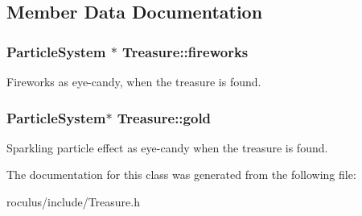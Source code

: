 \subsection{\-Member \-Data \-Documentation}
\hypertarget{classTreasure_a03e1ea9a9e71f70f453b8bd7e46d5a02}{
\subsubsection[{fireworks}]{\setlength{\rightskip}{0pt plus 5cm}\-Particle\-System $\ast$ {\bf \-Treasure\-::fireworks}}}\label{classTreasure_a03e1ea9a9e71f70f453b8bd7e46d5a02}
\-Fireworks as eye-\/candy, when the treasure is found. \hypertarget{classTreasure_a81c9f96d7d58e6181a2e1fef8e815c65}{
\subsubsection[{gold}]{\setlength{\rightskip}{0pt plus 5cm}\-Particle\-System$\ast$ {\bf \-Treasure\-::gold}}}\label{classTreasure_a81c9f96d7d58e6181a2e1fef8e815c65}
\-Sparkling particle effect as eye-\/candy when the treasure is found. 

\-The documentation for this class was generated from the following file\-:\begin{DoxyCompactItemize}
\item 
roculus/include/\-Treasure.\-h\end{DoxyCompactItemize}
